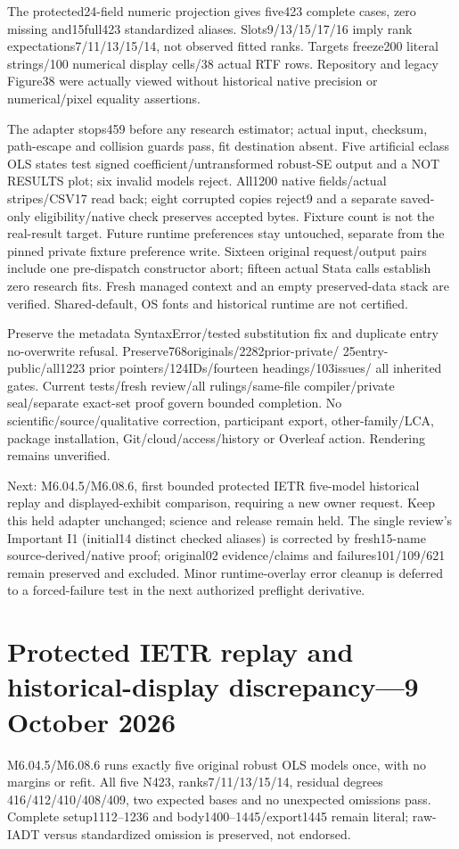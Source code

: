 \documentclass[11pt,a4paper]{article}
\begin{document}
The protected24-field numeric projection gives five423 complete cases,
zero missing and15full423 standardized aliases. Slots9/13/15/17/16
imply rank expectations7/11/13/15/14, not observed fitted ranks.
Targets freeze200 literal strings/100 numerical display cells/38 actual
RTF rows. Repository and legacy Figure38 were actually viewed without
historical native precision or numerical/pixel equality assertions.

The adapter stops459 before any research estimator; actual input,
checksum, path-escape and collision guards pass, fit destination absent.
Five artificial eclass OLS states test signed coefficient/untransformed
robust-SE output and a NOT RESULTS plot; six invalid models reject.
All1200 native fields/actual stripes/CSV17 read back; eight corrupted
copies reject9 and a separate saved-only eligibility/native check
preserves accepted bytes. Fixture count is not the real-result target.
Future runtime preferences stay untouched, separate from the pinned
private fixture preference write. Sixteen original request/output pairs
include one pre-dispatch constructor abort; fifteen actual Stata calls
establish zero research fits. Fresh managed context and an empty
preserved-data stack are verified.
Shared-default, OS fonts and historical runtime are not certified.

Preserve the metadata SyntaxError/tested substitution fix and duplicate
entry no-overwrite refusal. Preserve768originals/2282prior-private/
25entry-public/all1223 prior pointers/124IDs/fourteen headings/103issues/
all inherited gates. Current tests/fresh review/all rulings/same-file
compiler/private seal/separate exact-set proof govern bounded completion.
No scientific/source/qualitative correction, participant export,
other-family/LCA, package installation, Git/cloud/access/history or
Overleaf action. Rendering remains unverified.

Next: M6.04.5/M6.08.6, first bounded protected IETR five-model historical
replay and displayed-exhibit comparison, requiring a new owner request.
Keep this held adapter unchanged; science and release remain held.
The single review's Important I1 (initial14 distinct checked aliases)
is corrected by fresh15-name source-derived/native proof; original02
evidence/claims and failures101/109/621 remain preserved and excluded.
Minor runtime-overlay error cleanup is deferred to a forced-failure
test in the next authorized preflight derivative.

\section*{Protected IETR replay and historical-display discrepancy---9 October 2026}
M6.04.5/M6.08.6 runs exactly five original robust OLS models once, with
no margins or refit. All five N423, ranks7/11/13/15/14, residual degrees
416/412/410/408/409, two expected bases and no unexpected omissions pass.
Complete setup1112--1236 and body1400--1445/export1445 remain literal;
raw-IADT versus standardized omission is preserved, not endorsed.
\end{document}
